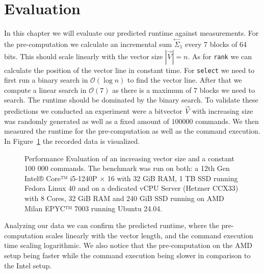 \documentclass[a4paper,UKenglish,cleveref, autoref, thm-restate]{lipics-v2021}
\def\code#1{\texttt{#1}}
\newcommand\prevsum[0]{\ensuremath{\overset{\leftarrow}{\Sigma}_1}}
\begin{document}
\section{Evaluation}
In this chapter we will evaluate our predicted runtime against measurements.
For the pre-computation we calculate an incremental sum $\prevsum$ every 7 blocks of 64 bits.
This should scale linearly with the vector size $|\vec{V}|=n$.
As for \code{rank} we can calculate the position of the vector line in constant time.
For \code{select} we need to first run a binary search in $\mathcal{O}(\log{n})$ to find the vector line.
After that we compute a linear search in $\mathcal{O}(7)$ as there is a maximum of 7 blocks we need to search.
The runtime should be dominated by the binary search.
To validate these predictions we conducted an experiment were a bitvector $\vec{V}$ with increasing
size was randomly generated as well as a fixed amount of $100 000$ commands.
We then measured the runtime for the pre-computation as well as the command execution.
In Figure~\ref{fig:performance_eval} the recorded data is visualized.
\begin{figure}[t]
    \centering
    
    \caption{%
        Performance Evaluation of an increasing vector size and a constant 100 000 commands.
        The benchmark was run on both:
        a 12th Gen Intel® Core™ i5-1240P × 16 with 32 GiB RAM, 1 TB SSD running Fedora Linux 40
        and on a dedicated vCPU Server (Hetzner CCX33) with 
        8 Cores, 32 GiB RAM and 240 GiB SSD running on AMD Milan EPYC™ 7003 running Ubuntu 24.04.
    }
    \label{fig:performance_eval}
\end{figure}
Analyzing our data we can confirm the predicted runtime, where the pre-computation scales linearly
with the vector length, and the command execution time scaling logarithmic.
We also notice that the pre-computation on the AMD setup being faster while the command execution being
slower in comparison to the Intel setup.



% 

\appendix
\end{document}
